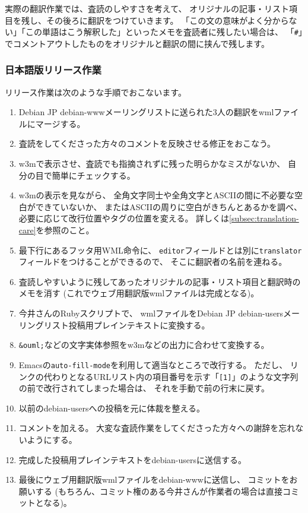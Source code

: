 \documentclass[mingoth,a4paper]{jsarticle}
\begin{document}
実際の翻訳作業では、査読のしやすさを考えて、
オリジナルの記事・リスト項目を残し、その後ろに翻訳をつけていきます。
「この文の意味がよく分からない」「この単語はこう解釈した」といったメモを査読者に残したい場合は、
「\verb|#|」でコメントアウトしたものをオリジナルと翻訳の間に挟んで残します。

\subsubsection{日本語版リリース作業}

リリース作業は次のような手順でおこないます。

\begin{enumerate}
 \item Debian JP debian-wwwメーリングリストに送られた3人の翻訳をwmlファイルにマージする。
 \item 査読をしてくださった方々のコメントを反映させる修正をおこなう。
 \item w3mで表示させ、査読でも指摘されずに残った明らかなミスがないか、
   自分の目で簡単にチェックする。
 \item w3mの表示を見ながら、
   全角文字同士や全角文字とASCIIの間に不必要な空白ができていないか、
   またはASCIIの周りに空白がきちんとあるかを調べ、
   必要に応じて改行位置やタグの位置を変える。
   詳しくは\ref{subsec:translation-care}を参照のこと。
 \item 最下行にあるフッタ用WML命令に、
   \verb|editor|フィールドとは別に\verb|translator|フィールドをつけることができるので、
   そこに翻訳者の名前を連ねる。
 \item 査読しやすいように残してあったオリジナルの記事・リスト項目と翻訳時のメモを消す (これでウェブ用翻訳版wmlファイルは完成となる)。
 \item 今井さんのRubyスクリプトで、
   wmlファイルをDebian JP debian-usersメーリングリスト投稿用プレインテキストに変換する。
 \item \verb|&ouml;|などの文字実体参照をw3mなどの出力に合わせて変換する。
 \item Emacsの\verb|auto-fill-mode|を利用して適当なところで改行する。
   ただし、
   リンクの代わりとなるURLリスト内の項目番号を示す「\verb|[1]|」のような文字列の前で改行されてしまった場合は、
   それを手動で前の行末に戻す。
 \item 以前のdebian-usersへの投稿を元に体裁を整える。
 \item コメントを加える。
   大変な査読作業をしてくださった方々への謝辞を忘れないようにする。
 \item 完成した投稿用プレインテキストをdebian-usersに送信する。
 \item 最後にウェブ用翻訳版wmlファイルをdebian-wwwに送信し、
   コミットをお願いする (もちろん、コミット権のある今井さんが作業者の場合は直接コミットとなる)。
\end{enumerate}
\end{document}
